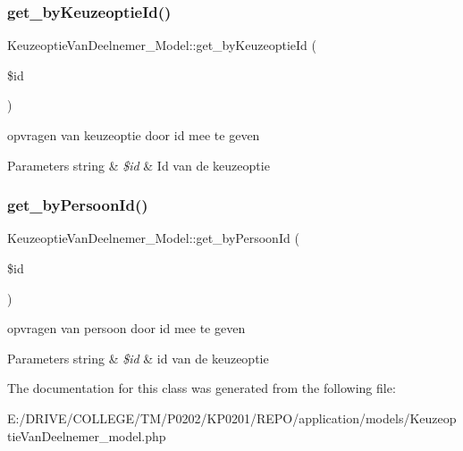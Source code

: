 \subsubsection{\texorpdfstring{get\+\_\+by\+Keuzeoptie\+Id()}{get\_byKeuzeoptieId()}}
{\footnotesize\ttfamily Keuzeoptie\+Van\+Deelnemer\+\_\+\+Model\+::get\+\_\+by\+Keuzeoptie\+Id (\begin{DoxyParamCaption}\item[{}]{\$id }\end{DoxyParamCaption})}

opvragen van keuzeoptie door id mee te geven 
\begin{DoxyParams}[1]{Parameters}
string & {\em \$id} & Id van de keuzeoptie \\
\hline
\end{DoxyParams}
\mbox{\label{class_keuzeoptie_van_deelnemer___model_a24cf82d6b80c9d3429c1ad3d0b062cf3}} 
\subsubsection{\texorpdfstring{get\+\_\+by\+Persoon\+Id()}{get\_byPersoonId()}}
{\footnotesize\ttfamily Keuzeoptie\+Van\+Deelnemer\+\_\+\+Model\+::get\+\_\+by\+Persoon\+Id (\begin{DoxyParamCaption}\item[{}]{\$id }\end{DoxyParamCaption})}

opvragen van persoon door id mee te geven 
\begin{DoxyParams}[1]{Parameters}
string & {\em \$id} & id van de keuzeoptie \\
\hline
\end{DoxyParams}


The documentation for this class was generated from the following file\+:\begin{DoxyCompactItemize}
\item 
E\+:/\+D\+R\+I\+V\+E/\+C\+O\+L\+L\+E\+G\+E/\+T\+M/\+P0202/\+K\+P0201/\+R\+E\+P\+O/application/models/Keuzeoptie\+Van\+Deelnemer\+\_\+model.\+php\end{DoxyCompactItemize}

